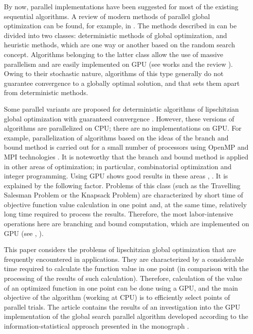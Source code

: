 \documentclass[smallcondensed]{svjour3}     %
\begin{document}
By now, parallel implementations have been suggested for most of the existing sequential algorithms. A review of modern methods of parallel global optimization can be found, for example, in \cite{RefApuzzo}. The methods described in \cite{RefApuzzo} can be divided into two classes: deterministic methods of global optimization, and heuristic methods, which are one way or another based on the random search concept. Algorithms belonging to the latter class allow the use of massive parallelism and are easily implemented on GPU (see works \cite{RefFerreiro,RefZhu,RefGarcia,RefMussi} and the review \cite{RefLangdon}). Owing to their stochastic nature, algorithms of this type generally do not guarantee convergence to a globally optimal solution, and that sets them apart from deterministic methods.

Some parallel variants are proposed for deterministic algorithms of lipschitzian global optimization with guaranteed convergence \cite{RefGergel2005,RefEvtushenko,RefHe,RefPaulavicius}. However, these versions of algorithms are parallelized on CPU; there are no implementations on GPU. For example, parallelization of algorithms based on the ideas of the branch and bound method is carried out for a small number of processors using OpenMP and MPI technologies \cite{RefPaulavicius}. It is noteworthy that the branch and bound method is applied in other areas of optimization; in particular, combinatorial optimization and integer programming. Using GPU shows good results in these areas \cite{RefBoukedjar}, \cite{RefCarneiro}. It is explained by the following factor. Problems of this class (such as the Travelling Salesman Problem or the Knapsack Problem) are characterized by short time of objective function value calculation in one point and, at the same time, relatively long time required to process the results. Therefore, the most labor-intensive operations here are branching and bound computation, which are implemented on GPU (see \cite{RefBoukedjar}, \cite{RefCarneiro}).

This paper considers the problems of lipschitzian global optimization that are frequently encountered in applications. They are characterized by a considerable time required to calculate the function value in one point (in comparison with the processing of the results of such calculation). Therefore, calculation of the value of an optimized function in one point can be done using a GPU, and the main objective of the algorithm (working at CPU) is to efficiently select points of parallel trials. The article contains the results of an investigation into the GPU implementation of the global search parallel algorithm developed according to the information-statistical approach presented in the monograph \cite{RefStrongin2000}.
\end{document}
